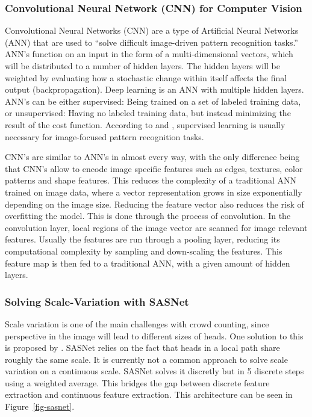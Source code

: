 \documentclass[
]{article}
\begin{document}
\hypertarget{convolutional-neural-network-cnn-for-computer-vision}{%
\subsubsection{Convolutional Neural Network (CNN) for Computer
Vision}\label{convolutional-neural-network-cnn-for-computer-vision}}

Convolutional Neural Networks (CNN) are a type of Artificial Neural
Networks (ANN) that are used to ``solve difficult image-driven pattern
recognition tasks.'' \autocite{DBLP:journals/corr/OSheaN15} ANN's
function on an input in the form of a multi-dimensional vectors, which
will be distributed to a number of hidden layers. The hidden layers will
be weighted by evaluating how a stochastic change within itself affects
the final output (backpropagation). Deep learning is an ANN with
multiple hidden layers. ANN's can be either supervised: Being trained on
a set of labeled training data, or unsupervised: Having no labeled
training data, but instead minimizing the result of the cost function.
According to \textcite{DBLP:journals/corr/OSheaN15} and
\textcite{NIPS2010_fe73f687}, supervised learning is usually necessary
for image-focused pattern recognition tasks.

CNN's are similar to ANN's in almost every way, with the only difference
being that CNN's allow to encode image specific features such as edges,
textures, color patterns and shape features. This reduces the complexity
of a traditional ANN trained on image data, where a vector
representation grows in size exponentially depending on the image size.
Reducing the feature vector also reduces the risk of overfitting the
model. This is done through the process of convolution. In the
convolution layer, local regions of the image vector are scanned for
image relevant features. Usually the features are run through a pooling
layer, reducing its computational complexity by sampling and
down-scaling the features. This feature map is then fed to a traditional
ANN, with a given amount of hidden layers.

\hypertarget{solving-scale-variation-with-sasnet}{%
\subsubsection{Solving Scale-Variation with
SASNet}\label{solving-scale-variation-with-sasnet}}

Scale variation is one of the main challenges with crowd counting, since
perspective in the image will lead to different sizes of heads. One
solution to this is proposed by \textcite{sasnet}. SASNet relies on the
fact that heads in a local path share roughly the same scale. It is
currently not a common approach to solve scale variation on a continuous
scale. SASNet solves it discretly but in 5 discrete steps using a
weighted average. This bridges the gap between discrete feature
extraction and continuous feature extraction. This architecture can be
seen in Figure~\ref{fig-sasnet}.
\end{document}
